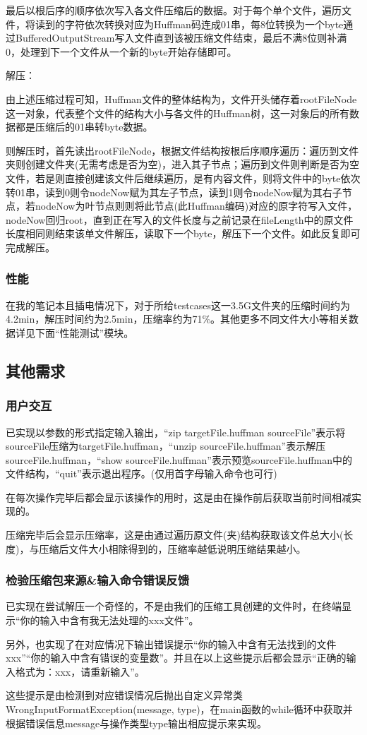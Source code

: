 \documentclass[11pt,a4paper]{article}
\begin{document}
\par{最后以根后序的顺序依次写入各文件压缩后的数据。对于每个单个文件，遍历文件，将读到的字符依次转换对应为Huffman码连成01串，每8位转换为一个byte通过BufferedOutputStream写入文件直到该被压缩文件结束，最后不满8位则补满0，处理到下一个文件从一个新的byte开始存储即可。}
\newpage
\par{解压：}
\par{由上述压缩过程可知，Huffman文件的整体结构为，文件开头储存着rootFileNode这一对象，代表整个文件的结构大小与各文件的Huffman树，这一对象后的所有数据都是压缩后的01串转byte数据。}
\par{则解压时，首先读出rootFileNode，根据文件结构按根后序顺序遍历：遍历到文件夹则创建文件夹(无需考虑是否为空)，进入其子节点；遍历到文件则判断是否为空文件，若是则直接创建该文件后继续遍历，是有内容文件，则将文件中的byte依次转01串，读到0则令nodeNow赋为其左子节点，读到1则令nodeNow赋为其右子节点，若nodeNow为叶节点则则将此节点(此Huffman编码)对应的原字符写入文件，nodeNow回归root，直到正在写入的文件长度与之前记录在fileLength中的原文件长度相同则结束该单文件解压，读取下一个byte，解压下一个文件。如此反复即可完成解压。}
\subsubsection*{性能}
\par{在我的笔记本且插电情况下，对于所给testcases这一3.5G文件夹的压缩时间约为4.2min，解压时间约为2.5min，压缩率约为71\%。其他更多不同文件大小等相关数据详见下面“性能测试”模块。}
\subsection*{其他需求}
\subsubsection*{用户交互}
\par{已实现以参数的形式指定输入输出，“zip targetFile.huffman sourceFile”表示将sourceFile压缩为targetFile.huffman，“unzip sourceFile.huffman”表示解压sourceFile.huffman，“show sourceFile.huffman”表示预览sourceFile.huffman中的文件结构，“quit”表示退出程序。(仅用首字母输入命令也可行)}
\par{在每次操作完毕后都会显示该操作的用时，这是由在操作前后获取当前时间相减实现的。}
\par{压缩完毕后会显示压缩率，这是由通过遍历原文件(夹)结构获取该文件总大小(长度)，与压缩后文件大小相除得到的，压缩率越低说明压缩结果越小。}
\subsubsection*{检验压缩包来源\&输入命令错误反馈}
\par{已实现在尝试解压一个奇怪的，不是由我们的压缩工具创建的文件时，在终端显示“你的输入中含有我无法处理的xxx文件”。}
\par{另外，也实现了在对应情况下输出错误提示“你的输入中含有无法找到的文件xxx”“你的输入中含有错误的变量数”。并且在以上这些提示后都会显示“正确的输入格式为：xxx，请重新输入”。}
\par{这些提示是由检测到对应错误情况后抛出自定义异常类WrongInputFormatException(message, type)，在main函数的while循环中获取并根据错误信息message与操作类型type输出相应提示来实现。}
\end{document}
